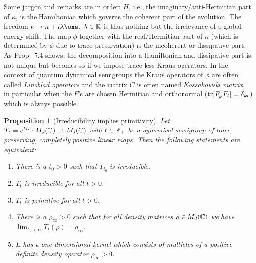 \documentclass[11pt,a4paper]{article}
\theoremstyle{plain}
\newtheorem{proposition}{Proposition}
\begin{document}
Some jargon and remarks are in order: $H$, i.e., the imaginary/anti-Hermitian part of $\kappa$, is the Hamiltonian which governs the coherent part of the evolution. The freedom $\kappa\to\kappa+i\lambda\one$, $\lambda\in\mathbb{R}$ is thus nothing but the irrelevance of a global energy shift. The map $\phi$ together with the real/Hermitian part of $\kappa$ (which is determined by $\phi$ due to trace preservation) is the incoherent or dissipative part. As Prop.~7.4 shows, the decomposition into a Hamiltonian and dissipative part is not unique but becomes so if we impose trace-less Kraus operators. In the context of quantum dynamical semigroups the Kraus operators of $\phi$ are often called \emph{Lindblad operators} and the matrix $C$ is often named \emph{Kossakowski matrix}, in particular when the $F$'s are chosen Hermitian and orthonormal ($\operatorname{tr}[F_k^{\dagger}F_l]=\delta_{kl}$) which is always possible.

\begin{proposition}[Irreducibility implies primitivity]
    Let $T_t=e^{tL}:M_d(\mathbb{C})\to M_d(\mathbb{C})$ with $t\in\mathbb{R}_{+}$ be a dynamical semigroup of trace-preserving, completely positive linear maps. Then the following statements are equivalent:
    \begin{enumerate}
        \item There is a $t_0>0$ such that $T_{t_0}$ is irreducible.
        \item $T_t$ is irreducible for all $t>0$.
        \item $T_t$ is primitive for all $t>0$.
        \item There is a $\rho_\infty>0$ such that for all density matrices $\rho\in M_d(\mathbb{C})$ we have $\lim_{t\to\infty}T_t(\rho)=\rho_\infty$.
        \item $L$ has a one-dimensional kernel which consists of multiples of a positive definite density operator $\rho_\infty>0$.
    \end{enumerate}
\end{proposition}
\end{document}
